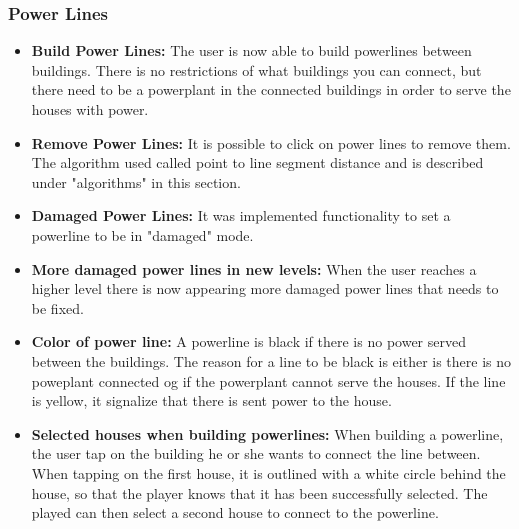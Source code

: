 	\subsubsection{Power Lines}
		\begin{itemize}
			\item {\bf Build Power Lines: } The user is now able to build powerlines
			between buildings. There is no restrictions of what buildings you can connect, 
			but there need to be a powerplant in the connected buildings in order to serve the houses 
			with power.
			\item {\bf Remove Power Lines: } It is possible to click on power 
			lines to remove them. The algorithm used called point to line segment 
			distance and is described under "algorithms" in this section. 
			\item {\bf Damaged Power Lines: } It was implemented functionality to set a 
			powerline to be in "damaged" mode. 
			\item {\bf More damaged power lines in new levels: } When the user reaches a higher level
			there is now appearing more damaged power lines that needs to be fixed. 
			\item {\bf Color of power line: } A powerline is black if there is no power served between
			the buildings. The reason for a line to be black is either is there is no poweplant
			connected og if the powerplant cannot serve the houses. If the line is yellow, it 
			signalize that there is sent power to the house. 
			\item {\bf Selected houses when building powerlines: } When building a powerline, 
			the user tap on the building he or she wants to connect the line between. When tapping on the
			first house, it is outlined with a white circle behind the house, so that the player knows
			that it has been successfully selected. The played can then select a second house to connect
			to the powerline.
		\end{itemize}

